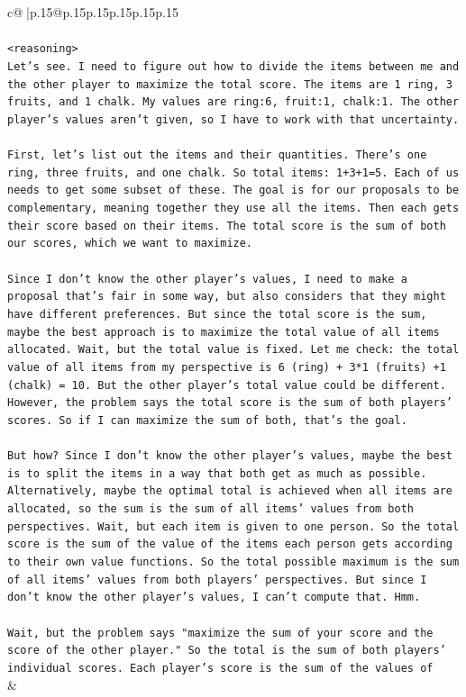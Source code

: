 \documentclass{article}
\begin{document}
{\begin{supertabular}{c@{$\;$}|p{.15\linewidth}@{}p{.15\linewidth}p{.15\linewidth}p{.15\linewidth}p{.15\linewidth}p{.15\linewidth}}
{{{\\ 
\\ 
\texttt{<reasoning>} \\
\texttt{Let's see. I need to figure out how to divide the items between me and the other player to maximize the total score. The items are 1 ring, 3 fruits, and 1 chalk. My values are ring:6, fruit:1, chalk:1. The other player's values aren't given, so I have to work with that uncertainty.} \\
\\ 
\texttt{First, let's list out the items and their quantities. There's one ring, three fruits, and one chalk. So total items: 1+3+1=5. Each of us needs to get some subset of these. The goal is for our proposals to be complementary, meaning together they use all the items. Then each gets their score based on their items. The total score is the sum of both our scores, which we want to maximize.} \\
\\ 
\texttt{Since I don't know the other player's values, I need to make a proposal that's fair in some way, but also considers that they might have different preferences. But since the total score is the sum, maybe the best approach is to maximize the total value of all items allocated. Wait, but the total value is fixed. Let me check: the total value of all items from my perspective is 6 (ring) + 3*1 (fruits) +1 (chalk) = 10. But the other player's total value could be different. However, the problem says the total score is the sum of both players' scores. So if I can maximize the sum of both, that's the goal.} \\
\\ 
\texttt{But how? Since I don't know the other player's values, maybe the best is to split the items in a way that both get as much as possible. Alternatively, maybe the optimal total is achieved when all items are allocated, so the sum is the sum of all items' values from both perspectives. Wait, but each item is given to one person. So the total score is the sum of the value of the items each person gets according to their own value functions. So the total possible maximum is the sum of all items' values from both players' perspectives. But since I don't know the other player's values, I can't compute that. Hmm.} \\
\\ 
\texttt{Wait, but the problem says "maximize the sum of your score and the score of the other player." So the total is the sum of both players' individual scores. Each player's score is the sum of the values of} \\
            }
        }
    }
    & \\ \\


\end{supertabular}}
\end{document}
